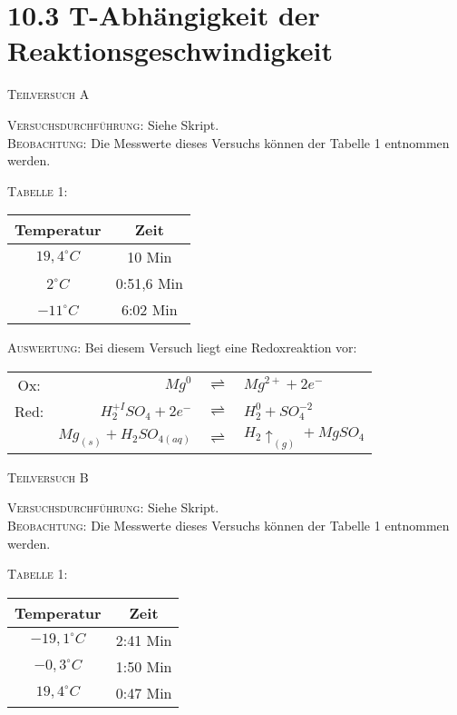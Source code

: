 \documentclass[11pt, a4paper]{article}
\begin{document}
\newpage
\section{10.3 T-Abhängigkeit der Reaktionsgeschwindigkeit}


\begin{center}
\textsc{Teilversuch A}
\end{center}
\textsc{Versuchsdurchführung:} Siehe Skript.\\

\textsc{Beobachtung:}\hspace{5mm} Die Messwerte dieses Versuchs können der Tabelle 1 entnommen werden.\\
\begin{center}
\textsc{Tabelle 1:}\\
\begin{tabular}{cc}
Temperatur & Zeit\\
\hline
$19,4^\circ C$ & 10 Min\\
$2^\circ C$ & 0:51,6 Min\\
$-11^\circ C$ & 6:02 Min\\
\end{tabular}
\end{center}

\textsc{Auswertung:}\hspace{8mm} Bei diesem Versuch liegt eine Redoxreaktion vor:\\
\begin{center}
\begin{tabular}{crcl}
Ox: & $Mg^0$ & $\rightleftharpoons$ & $Mg^{2+}+2e^-$\\
Red: & $H_2^{+I}SO_4 + 2e^-$ & $\rightleftharpoons$ & $H_2^0 + SO_4^{-2}$\\
\hline
 & $Mg_{(s)} + H_2SO_{4(aq)}$ & $\rightleftharpoons$ & $H_{2}\uparrow_{(g)} + MgSO_4$\\
\end{tabular}
\end{center}
\vspace{5mm}
\begin{center}
\textsc{Teilversuch B}
\end{center}

\textsc{Versuchsdurchführung:} Siehe Skript.\\

\textsc{Beobachtung:}\hspace{5mm} Die Messwerte dieses Versuchs können der Tabelle 1 entnommen werden.\\
\begin{center}
\textsc{Tabelle 1:}\\
\begin{tabular}{cc}
Temperatur & Zeit\\
\hline
$-19,1^\circ C$ & 2:41 Min\\
$-0,3^\circ C$ & 1:50 Min\\
$19,4^\circ C$ & 0:47 Min\\
\end{tabular}
\end{center}
\end{document}
